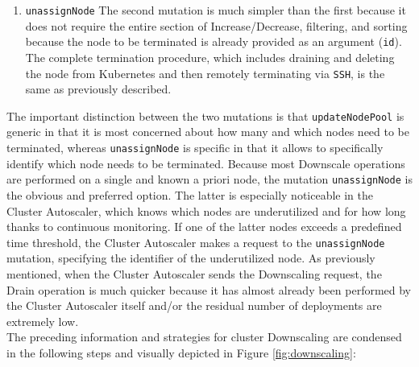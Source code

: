 \begin{enumerate}
  \item \texttt{unassignNode}
    \newline
    The second mutation is much simpler than the first because it does not
    require the entire section of Increase/Decrease, filtering, and sorting
    because the node to be terminated is already provided as an argument (\texttt{id}).
    \newline
    The complete termination procedure, which includes draining and deleting the
    node from Kubernetes and then remotely terminating via \texttt{SSH}, is the same
    as previously described.
\end{enumerate}
The important distinction between the two mutations is that \texttt{updateNodePool}
is generic in that it is most concerned about how many and which nodes need to be
terminated, whereas \texttt{unassignNode} is specific in that it allows to specifically
identify which node needs to be terminated. Because most Downscale operations
are performed on a single and known a priori node, the mutation \texttt{unassignNode}
is the obvious and preferred option. The latter is especially noticeable in the Cluster
Autoscaler, which knows which nodes are underutilized and for how long thanks to
continuous monitoring. If one of the latter nodes exceeds a predefined time threshold,
the Cluster Autoscaler makes a request to the \texttt{unassignNode} mutation,
specifying the identifier of the underutilized node. As previously mentioned,
when the Cluster Autoscaler sends the Downscaling request, the Drain operation is
much quicker because it has almost already been performed by the Cluster Autoscaler
itself and/or the residual number of deployments are extremely low. \\ %
The preceding information and strategies for cluster Downscaling are condensed in
the following steps and visually depicted in Figure \ref{fig:downscaling}:
